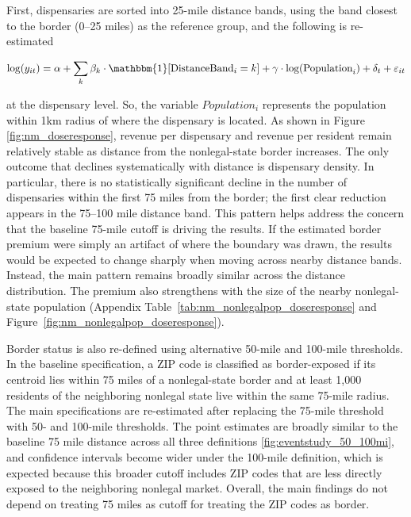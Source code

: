 \documentclass[12pt]{article}
\begin{document}
First, dispensaries are sorted into 25-mile distance bands, using the band closest to the border (0--25 miles) as the reference group, and the following is re-estimated

\begin{equation}
\log(y_{it}) = \alpha + \sum_{k} \beta_k \cdot \mathbbm{1}[\text{DistanceBand}_i = k] + \gamma\cdot\log(\text{Population}_i) + \delta_t + \varepsilon_{it}
\end{equation}

at the dispensary level. So, the variable $Population_i$ represents the population within 1km radius of where the dispensary is located. As shown in Figure \ref{fig:nm_doseresponse}, revenue per dispensary and revenue per resident remain relatively stable as distance from the nonlegal-state border increases. The only outcome that declines systematically with distance is dispensary density. In particular, there is no statistically significant decline in the number of dispensaries within the first 75 miles from the border; the first clear reduction appears in the 75--100 mile distance band. This pattern helps address the concern that the baseline 75-mile cutoff is driving the results. If the estimated border premium were simply an artifact of where the boundary was drawn, the results would be expected to change sharply when moving across nearby distance bands. Instead, the main pattern remains broadly similar across the distance distribution. The premium also strengthens with the size of the nearby nonlegal-state population (Appendix Table~\ref{tab:nm_nonlegalpop_doseresponse} and Figure~\ref{fig:nm_nonlegalpop_doseresponse}).

Border status is also re-defined using alternative 50-mile and 100-mile thresholds. In the baseline specification, a ZIP code is classified as border-exposed if its centroid lies within 75 miles of a nonlegal-state border and at least 1,000 residents of the neighboring nonlegal state live within the same 75-mile radius. The main specifications are re-estimated after replacing the 75-mile threshold with 50- and 100-mile thresholds. The point estimates are broadly similar to the baseline 75 mile distance across all three definitions \ref{fig:eventstudy_50_100mi}, and confidence intervals become wider under the 100-mile definition, which is expected because this broader cutoff includes ZIP codes that are less directly exposed to the neighboring nonlegal market. Overall, the main findings do not depend on treating 75 miles as cutoff for treating the ZIP codes as border. 
\end{document}
